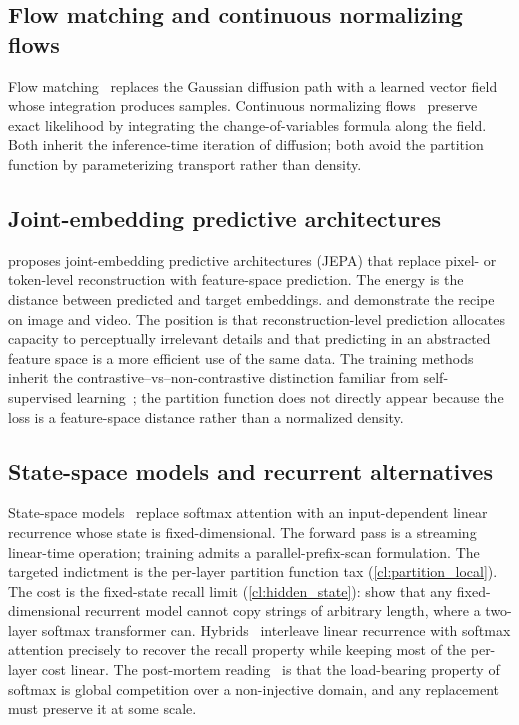 \subsection{Flow matching and continuous normalizing flows}
\label{ssec:flow_matching}

Flow matching~\citep{lipman2023flow,liu2023flow,albergo2023building} replaces the Gaussian diffusion path with a learned vector field whose integration produces samples.
Continuous normalizing flows~\citep{chen2018neural,grathwohl2019ffjord} preserve exact likelihood by integrating the change-of-variables formula along the field.
Both inherit the inference-time iteration of diffusion;
both avoid the partition function by parameterizing transport rather than density.

\subsection{Joint-embedding predictive architectures}
\label{ssec:jepa}

\citet{lecun2022autonomous} proposes joint-embedding predictive architectures (JEPA) that replace pixel- or token-level reconstruction with feature-space prediction.
The energy is the distance between predicted and target embeddings.
\citet{assran2023ijepa} and \citet{bardes2023vjepa} demonstrate the recipe on image and video.
The position is that reconstruction-level prediction allocates capacity to perceptually irrelevant details and that predicting in an abstracted feature space is a more efficient use of the same data.
The training methods inherit the contrastive--vs--non-contrastive distinction familiar from self-supervised learning~\citep{chen2020simple,grill2020bootstrap,he2022masked};
the partition function does not directly appear because the loss is a feature-space distance rather than a normalized density.

\subsection{State-space models and recurrent alternatives}
\label{ssec:ssm}

State-space models~\citep{gu2022efficiently,gu2023mamba,dao2024transformers} replace softmax attention with an input-dependent linear recurrence whose state is fixed-dimensional.
The forward pass is a streaming linear-time operation;
training admits a parallel-prefix-scan formulation.
The targeted indictment is the per-layer partition function tax (\ref{cl:partition_local}).
The cost is the fixed-state recall limit (\ref{cl:hidden_state}): \citet{jelassi2024repeat} show that any fixed-dimensional recurrent model cannot copy strings of arbitrary length, where a two-layer softmax transformer can.
Hybrids~\citep{lieber2024jamba,dao2024transformers,deepseek2026v4} interleave linear recurrence with softmax attention precisely to recover the recall property while keeping most of the per-layer cost linear.
The post-mortem reading~\citep{zhang2024hedgehog,han2024bridging,mongaras2025expressiveness} is that the load-bearing property of softmax is global competition over a non-injective domain, and any replacement must preserve it at some scale.

